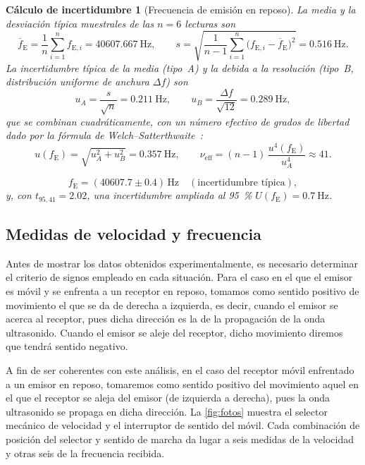 \documentclass[a4paper,11pt]{amsart}
\numberwithin{equation}{section}
\newcommand{\fE}{f_{\mathrm{E}}}              %
\newcommand{\ext}[1]{U(#1)}                   %
\newcommand{\mean}[1]{\overline{#1}}
\theoremstyle{cienplano}
\theoremstyle{ciendef}
\newtheorem{calculo}[proposicion]{Cálculo de incertidumbre}
\theoremstyle{cienobs}
\begin{document}
\begin{calculo}[Frecuencia de emisión en reposo]\label{calc:fE}
La media y la desviación típica muestrales de las $n=6$ lecturas son
\begin{equation}\label{eq:fEmedia}
  \mean{f}_{\mathrm{E}}=\frac{1}{n}\sum_{i=1}^{n}f_{\mathrm{E},i}=\SI{40607,667}{\hertz},
  \qquad
  s=\sqrt{\frac{1}{n-1}\sum_{i=1}^{n}\bigl(f_{\mathrm{E},i}-\mean{f}_{\mathrm{E}}\bigr)^{2}}=\SI{0,516}{\hertz}.
\end{equation}
La incertidumbre típica de la media (tipo~A) y la debida a la resolución
(tipo~B, distribución uniforme de anchura $\Delta f$) son
\begin{equation}\label{eq:fEuAuB}
  u_{A}=\frac{s}{\sqrt{n}}=\SI{0,211}{\hertz},
  \qquad
  u_{B}=\frac{\Delta f}{\sqrt{12}}=\SI{0,289}{\hertz},
\end{equation}
que se combinan cuadráticamente, con un número efectivo de grados de libertad
dado por la fórmula de Welch--Satterthwaite~\cite{NUM-ARG}:
\begin{equation}\label{eq:fEu}
  u(\fE)=\sqrt{u_{A}^{2}+u_{B}^{2}}=\SI{0,357}{\hertz},
  \qquad
  \nu_{\mathrm{eff}}=(n-1)\,\frac{u^{4}(\fE)}{u_{A}^{4}}\approx41.
\end{equation}
\begin{destacado}
\begin{equation}\label{eq:fE}
  \fE=(\num{40607,7}\pm\num{0,4})\,\si{\hertz}
  \quad(\text{incertidumbre típica}),
\end{equation}
{\small y, con $t_{95,41}=\num{2,02}$, una incertidumbre ampliada al
\SI{95}{\percent} $\ext{\fE}=\SI{0,7}{\hertz}$.}
\end{destacado}
\end{calculo}
\subsection{Medidas de velocidad y frecuencia}
Antes de mostrar los datos obtenidos experimentalmente, es necesario determinar el criterio de signos empleado en cada situación.
Para el caso en el que el emisor es móvil y se enfrenta a un receptor en reposo, tomamos como sentido positivo de movimiento el que se da de derecha a izquierda, es decir, cuando el emisor se acerca al receptor, pues dicha dirección es la de la propagación de la onda ultrasonido. Cuando el emisor se aleje del receptor, dicho movimiento diremos que tendrá sentido negativo.

A fin de ser coherentes con este análisis, en el caso del receptor móvil enfrentado a un emisor en reposo, tomaremos como sentido positivo del movimiento aquel en el que el receptor se aleja del emisor (de izquierda a derecha), pues la onda ultrasonido se propaga en dicha dirección.
La \cref{fig:fotos} muestra el selector mecánico de velocidad y el interruptor
de sentido del móvil. Cada combinación de posición del selector y sentido de
marcha da lugar a seis medidas de la velocidad y otras seis de la frecuencia
recibida.
\end{document}
